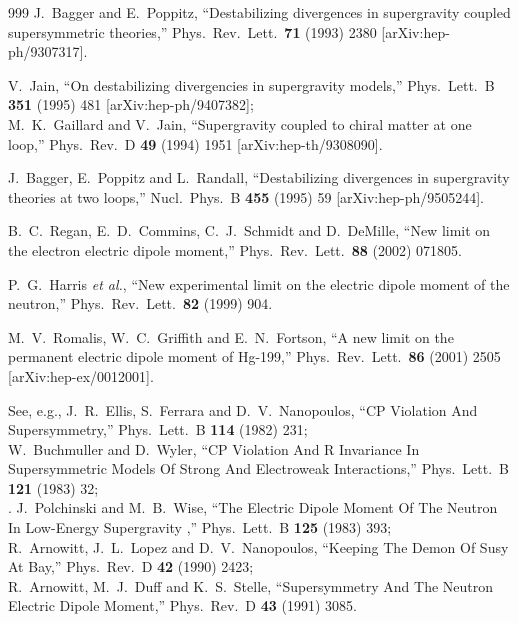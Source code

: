 \begin{thebibliography}{999}
  J.~Bagger and E.~Poppitz,
  ``Destabilizing divergences in supergravity coupled supersymmetric
  theories,''
  Phys.\ Rev.\ Lett.\  {\bf 71} (1993) 2380
  [arXiv:hep-ph/9307317].

 V.~Jain,
  ``On destabilizing divergencies in supergravity models,''
  Phys.\ Lett.\ B {\bf 351} (1995) 481
  [arXiv:hep-ph/9407382];\\
    M.~K.~Gaillard and V.~Jain,
  ``Supergravity coupled to chiral matter at one loop,''
  Phys.\ Rev.\ D {\bf 49} (1994) 1951
  [arXiv:hep-th/9308090].

  J.~Bagger, E.~Poppitz and L.~Randall,
  ``Destabilizing divergences in supergravity theories at two loops,''
  Nucl.\ Phys.\ B {\bf 455} (1995) 59
  [arXiv:hep-ph/9505244].

  B.~C.~Regan, E.~D.~Commins, C.~J.~Schmidt and D.~DeMille,
  ``New limit on the electron electric dipole moment,''
  Phys.\ Rev.\ Lett.\  {\bf 88} (2002) 071805.

  P.~G.~Harris {\it et al.},
  ``New experimental limit on the electric dipole moment of the neutron,''
  Phys.\ Rev.\ Lett.\  {\bf 82} (1999) 904.

  M.~V.~Romalis, W.~C.~Griffith and E.~N.~Fortson,
  ``A new limit on the permanent electric dipole moment of Hg-199,''
  Phys.\ Rev.\ Lett.\  {\bf 86} (2001) 2505
  [arXiv:hep-ex/0012001].

See, e.g., 
 J.~R.~Ellis, S.~Ferrara and D.~V.~Nanopoulos,
  ``CP Violation And Supersymmetry,''
  Phys.\ Lett.\ B {\bf 114} (1982) 231;\\
W.~Buchmuller and D.~Wyler,
  ``CP Violation And R Invariance In Supersymmetric Models Of Strong And
  Electroweak Interactions,''
  Phys.\ Lett.\ B {\bf 121} (1983) 32;\\.
  J.~Polchinski and M.~B.~Wise,
  ``The Electric Dipole Moment Of The Neutron In Low-Energy Supergravity ,''
  Phys.\ Lett.\ B {\bf 125} (1983) 393;\\
 R.~Arnowitt, J.~L.~Lopez and D.~V.~Nanopoulos,
  ``Keeping The Demon Of Susy At Bay,''
  Phys.\ Rev.\ D {\bf 42} (1990) 2423;\\
  R.~Arnowitt, M.~J.~Duff and K.~S.~Stelle,
  ``Supersymmetry And The Neutron Electric Dipole Moment,''
  Phys.\ Rev.\ D {\bf 43} (1991) 3085.


\end{thebibliography}
